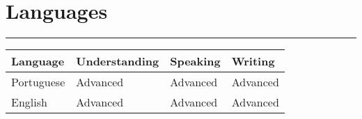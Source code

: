 \documentclass[a4paper,english]{article}
\newcommand{\topic}[1]{
\section*{#1} \vspace{-6mm}
\rule{\columnwidth}{.25mm}
}
\begin{document}
\topic{Languages}

\noindent
\begin{tabular}{llll}
Language & Understanding & Speaking & Writing \\
\hline
Portuguese & Advanced & Advanced & Advanced \\
English & Advanced & Advanced & Advanced \\
\end{tabular}
\end{document}

